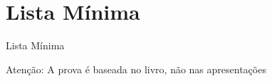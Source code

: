 \section{Lista Mínima}

\begin{frame}{Lista Mínima}

  \vfill
  Atenção: A prova é baseada no livro, não nas apresentações
\end{frame}


